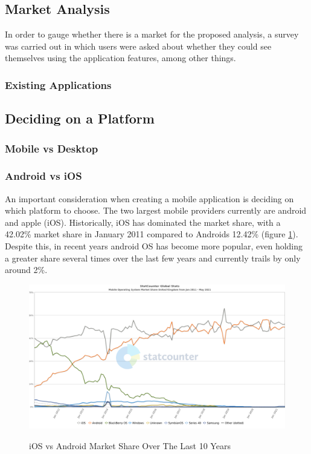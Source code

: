 \documentclass[12pt]{article}
\begin{document}
	\subsection{Market Analysis}
	In order to gauge whether there is a market for the proposed analysis, a survey was carried out in which users were asked about whether they could see themselves using the application features, among other things.
	 
	\subsubsection{Existing Applications}
	
	\subsection{Deciding on a Platform}
	\subsubsection{Mobile vs Desktop}
	
	\subsubsection{Android vs iOS}
	An important consideration when creating a mobile application is deciding on which platform to choose. The two largest mobile providers currently are android and apple (iOS). Historically, iOS has dominated the market share, with a 42.02\% market share in January 2011 compared to Androids 12.42\% (figure \ref{fig:ios-android}). Despite this, in recent years android OS has become more popular, even holding a greater share several times over the last few years and currently trails by only around 2\%.
	
	\begin{figure}[H]
		\centering
		\includegraphics[scale=0.4]{images/ios-android.png}
		\caption{iOS vs Android Market Share Over The Last 10 Years}
		\label{fig:ios-android}
		\cite{stat-counter-21}
	\end{figure}
	
\end{document}
